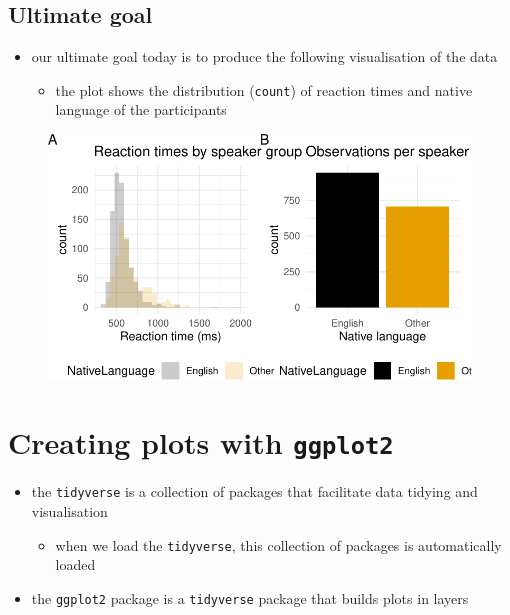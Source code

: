 \documentclass[
  letterpaper,
  DIV=11]{scrartcl}
\providecommand{\tightlist}{%
  \setlength{\itemsep}{0pt}\setlength{\parskip}{0pt}}\usepackage{longtable,booktabs,array}
\theoremstyle{definition}
\theoremstyle{remark}
\begin{document}
\hypertarget{ultimate-goal}{%
\subsection{Ultimate goal}\label{ultimate-goal}}

\begin{itemize}
\tightlist
\item
  our ultimate goal today is to produce the following visualisation of
  the data

  \begin{itemize}
  \tightlist
  \item
    the plot shows the distribution (\texttt{count}) of reaction times
    and native language of the participants
  \end{itemize}
\end{itemize}

\begin{figure}[centre]

{\centering \includegraphics{_intro_r_slides_files/figure-pdf/unnamed-chunk-13-1.pdf}

}

\end{figure}

\hypertarget{creating-plots-with-ggplot2}{%
\section{\texorpdfstring{Creating plots with
\texttt{ggplot2}}{Creating plots with ggplot2}}\label{creating-plots-with-ggplot2}}

\begin{itemize}
\tightlist
\item
  the \texttt{tidyverse} is a collection of packages that facilitate
  data tidying and visualisation

  \begin{itemize}
  \tightlist
  \item
    when we load the \texttt{tidyverse}, this collection of packages is
    automatically loaded
  \end{itemize}
\item
  the \texttt{ggplot2} package is a \texttt{tidyverse} package that
  builds plots in layers
\end{itemize}
\end{document}
